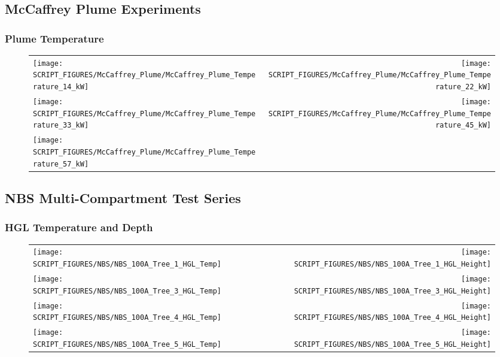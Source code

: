 \clearpage

\subsection{McCaffrey Plume Experiments}

\subsubsection{Plume Temperature}

\begin{figure}[!ht]
\begin{tabular*}{\textwidth}{l@{\extracolsep{\fill}}r}
\texttt{[image: SCRIPT\_FIGURES/McCaffrey\_Plume/McCaffrey\_Plume\_Temperature\_14\_kW]} &
\texttt{[image: SCRIPT\_FIGURES/McCaffrey\_Plume/McCaffrey\_Plume\_Temperature\_22\_kW]} \\
\texttt{[image: SCRIPT\_FIGURES/McCaffrey\_Plume/McCaffrey\_Plume\_Temperature\_33\_kW]} &
\texttt{[image: SCRIPT\_FIGURES/McCaffrey\_Plume/McCaffrey\_Plume\_Temperature\_45\_kW]} \\
\texttt{[image: SCRIPT\_FIGURES/McCaffrey\_Plume/McCaffrey\_Plume\_Temperature\_57\_kW]} &
\end{tabular*}
\label{McCaffrey_Plume_Temperature}
\end{figure}

\clearpage

\subsection{NBS Multi-Compartment Test Series}

\subsubsection{HGL Temperature and Depth}

\begin{figure}[!ht]
\begin{tabular*}{\textwidth}{l@{\extracolsep{\fill}}r}
\texttt{[image: SCRIPT\_FIGURES/NBS/NBS\_100A\_Tree\_1\_HGL\_Temp]} &
\texttt{[image: SCRIPT\_FIGURES/NBS/NBS\_100A\_Tree\_1\_HGL\_Height]} \\
\texttt{[image: SCRIPT\_FIGURES/NBS/NBS\_100A\_Tree\_3\_HGL\_Temp]} &
\texttt{[image: SCRIPT\_FIGURES/NBS/NBS\_100A\_Tree\_3\_HGL\_Height]} \\
\texttt{[image: SCRIPT\_FIGURES/NBS/NBS\_100A\_Tree\_4\_HGL\_Temp]} &
\texttt{[image: SCRIPT\_FIGURES/NBS/NBS\_100A\_Tree\_4\_HGL\_Height]} \\
\texttt{[image: SCRIPT\_FIGURES/NBS/NBS\_100A\_Tree\_5\_HGL\_Temp]} &
\texttt{[image: SCRIPT\_FIGURES/NBS/NBS\_100A\_Tree\_5\_HGL\_Height]}
\end{tabular*}
\end{figure}


